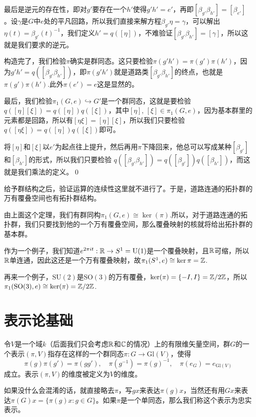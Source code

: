 最后是逆元的存在性，即对$g'$要存在一个$h'$使得$g'h'=e'$，再即$[\beta_{g'}\beta_{h'}]=[\beta_{e'}]$。设$\gamma$是$G$中$e$处的平凡回路，所以我们直接来解方程$\beta_{g'}\eta=\gamma$，可以解出$\eta(t)=\beta_{g'}(t)^{-1}$，我们定义$h'=q([\eta])$，不难验证$[\beta_{g'}\beta_{h'}]=[\gamma]$，所以这就是我们要求的逆元。

构造完了，我们检验$\pi$确实是群同态。这只要检验$\pi(g'h')=\pi(g')\pi(h')$，因为$g'h'=q([\beta_{g'}\beta_{h'}])$，即$\pi(g'h')$就是道路类$[\beta_{g'}\beta_{h'}]$的终点，也就是$\pi(g')\pi(h')$.此外$\pi(e')=e$这是显然的。

最后，我们检验$\pi_1(G,e)\hookrightarrow G'$是一个群同态，这就是要检验$q([\eta][\xi])=q([\eta])q([\xi])$，其中$[\eta]$, $[\xi]\in \pi_1(G,e)$，因为基本群里的元素都是回路，所以有$[\eta\xi]=[\eta][\xi]$，所以我们只要检验$q([\eta\xi])=q([\eta])q([\xi])$即可。

将$[\eta]$和$[\xi]$以$e'$为起点往上提升，然后再用$\pi$下降回来，他总可以写成某种$[\beta_{g'}]$和$[\beta_{h'}]$的形式，所以我们只要检验
$q([\beta_{g'}\beta_{h'}])=q([\beta_{g'}])q([\beta_{h'}])$，而这就是我们乘法的定义。\qed

\para 给予群结构之后，验证运算的连续性这里就不进行了。于是，道路连通的拓扑群的万有覆叠空间也有拓扑群结构。

\para 由上面这个定理，我们有群同构$\pi_1(G,e)\cong \ker(\pi)$.所以，对于道路连通的拓扑群，我们只要找到他的一个万有覆叠空间，那么覆叠映射的核就将给出拓扑群的基本群。

作为一个例子，我们知道$e^{2\pi it}:\mathbb{R}\to S^1=\mathrm{U}(1)$是一个覆叠映射，且$\mathbb{R}$可缩，所以$\mathbb{R}$单连通，因此这还是一个万有覆叠映射，故$\pi_1(S^1,e)\cong \ker{\pi}=\mathbb{Z}$.

再来一个例子，$\mathrm{SU}(2)$是$\mathrm{SO}(3)$的万有覆叠，$\ker(\pi)=\{-I,I\}=\mathbb{Z}/2\mathbb{Z}$，所以$\pi_1(\mathrm{SO}(3),e)\cong \ker(\pi)=\mathbb{Z}/2\mathbb{Z}$.


\chapter{表示论基础}

\para 令$V$是一个域$k$（后面我们只会考虑$\mathbb{R}$和$\mathbb{C}$的情况）上的有限维矢量空间，群$G$的一个表示$(\pi, V)$指存在这样的一个群同态$\pi:G\rightarrow \mathrm{Gl}(V)$，使得
\[
	\pi(g)\pi(g')=\pi(gg'),\quad \pi(g^{-1})=\pi(g)^{-1},\quad \pi(e_G)=e_{\mathrm{Gl}(V)}
\]
成立。表示$(\pi, V)$的维度被定义为$V$的维度。

如果没什么会混淆的话，就直接略去$\pi$，写$gx$来表达$\pi(g)x$，当然还有用$Gx$来表达$\pi(G)x=\{\pi(g)x:g\in G\}$。如果$\pi$是一个单同态，那么我们称这个表示为忠实表示。

